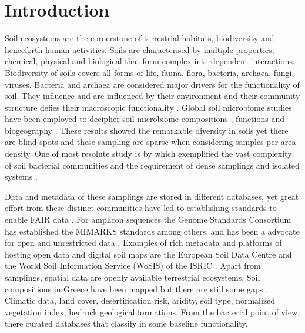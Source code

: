 \section{Introduction}\label{intro_integration}

Soil ecosystems are the cornerstone of terrestrial habitats, biodiversity and henceforth human activities.
Soils are characterised by multiple properties; chemical, physical and biological that 
form complex interdependent interactions. Biodiversity of soils covers
all forms of life, fauna, flora, bacteria, archaea, fungi, viruses. 
Bacteria and archaea are considered major drivers for the functionality of soil.
They influence and are influenced by their environment and their community structure 
defies their macroscopic functionality \parencite{Bahram2018}.
Global soil microbiome studies have been employed to decipher soil microbiome
compositions \parencite{thompson2017a-communal, Delgado-Baquerizo-atlas, Labouyrie2023},
functions \parencite{Bahram2018} and biogeography \parencite{Martiny2006, guerra2020Blind}.
These results showed the remarkable diversity in soils yet there are blind spots \parencite{guerra2020Blind}
and these sampling are sparse when considering samples per area density. One of most resolute
study is by \parencite{Karimi2020} which exemplified the 
vast complexity of soil bacterial communities and the requirement of
dense samplings and isolated systems \parencite{Dini-Andreote2021}.

Data and metadata of these samplings are stored in different databases, yet 
great effort from these distinct communities have led to establishing standards
to enable FAIR data \parencite{wilkinson2016the-fair}. For amplicon sequences the Genome Standards
Consortium \parencite{Field2011} has established the MIMARKS \parencite{yilmaz2011minimum}
standards among others, and has been a advocate for open and unrestricted data \parencite{Amann2019}.
Examples of rich metadata and platforms of hosting open data and digital soil maps are the 
European Soil Data Centre \parencite{Panagos2022} and the World Soil Information
Service (WoSIS) of the ISRIC \parencite{Batjes2024}. Apart from samplings,
spatial data are openly available terrestrial ecosystems. Soil compositions in Greece 
have been mapped but there are still some gaps \parencite{yassoglou2017soils}.
Climatic data, land cover, desertification risk, aridity, soil type, normalized
vegetation index, bedrock geological formations. From the bacterial point of view, 
there curated databases that classify in some baseline functionality. 

